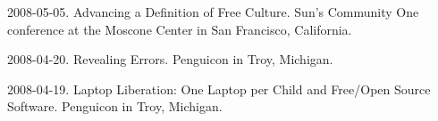 \documentclass[11pt]{article}
\newenvironment{cvlist}{
\begin{list}{}{\leftmargin=3.0em \itemindent=-3.0em}
  \setlength{\itemsep}{0pt}
  \setlength{\parskip}{0em}
  \setlength{\parsep}{1em}
  \setlength{\parindent}{0em}}
{\vspace{1em}
\end{list}}
\begin{document}
\begin{cvlist}
\item 2008-05-05. Advancing a Definition of Free Culture. Sun's Community One conference at the Moscone Center in San Francisco, California.
\item 2008-04-20. Revealing Errors. Penguicon in Troy, Michigan. %
\item 2008-04-19. Laptop Liberation: One Laptop per Child and Free/Open Source Software. Penguicon in Troy, Michigan. %

\end{cvlist}
\end{document}

